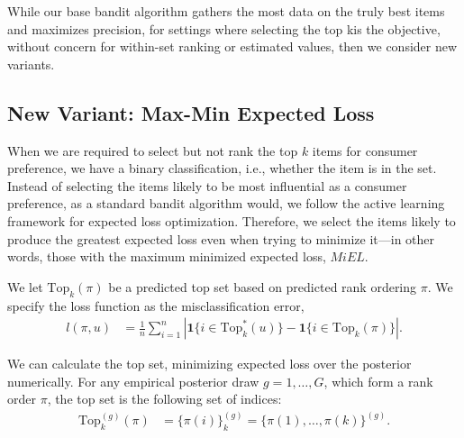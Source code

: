 \documentclass[nonblindrev]{informs3}
\newcommand{\numtopset}{k}
\newcommand{\topset}{\text{Top}_k}
\begin{document}
While our base bandit algorithm gathers the most data on the truly best items and maximizes precision, for settings where selecting the top \numtopset is the objective, without concern for within-set ranking or estimated values, then we consider new variants.

\subsection{New Variant: Max-Min Expected Loss}

When we are required to select but not rank the top $k$ items for consumer preference, we have a binary classification, i.e., whether the item is in the set. Instead of selecting the items likely to be most influential as a consumer preference, as a standard bandit algorithm would, we follow the active learning framework for expected loss optimization. Therefore, we select the items likely to produce the greatest expected loss even when trying to minimize it---in other words, those with the maximum minimized expected loss, $MiEL$. 

We let $\topset(\pi)$ be a predicted top set based on predicted rank ordering $\pi$. We specify the loss function as the misclassification error,
\begin{align}
l(\pi,u) &= \frac{1}{n} \sum_{i=1}^{n} \left| \mathbf{1}\{ i \in \topset^{*}(u) \}-\mathbf{1}\{ i \in \topset(\pi) \} \right|.
\end{align}



We can calculate the top set, minimizing expected loss over the posterior numerically. For any empirical posterior draw $g=1,\ldots,G$, which form a rank order $\pi$, the top set is the following set of indices:
\begin{align}
\topset^{(g)}(\pi) &= \{ \pi(i) \}_k^{(g)} = \{ \pi(1),\ldots,\pi(k) \}^{(g)}.
\end{align}


%
%
\end{document}

